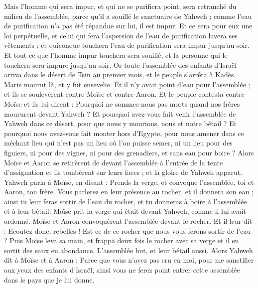 \begin{multicols}{2}
Mais l'homme qui sera impur, et qui ne se purifiera point, sera retranché du milieu de l'assemblée, parce qu'il a souillé le sanctuaire de Yahweh ; comme l'eau de purification n'a pas été répandue sur lui, il est impur.
Et ce sera pour eux une loi perpétuelle, et celui qui fera l'aspersion de l'eau de purification lavera ses vêtements ; et quiconque touchera l'eau de purification sera impur jusqu'au soir.
Et tout ce que l'homme impur touchera sera souillé, et la personne qui le touchera sera impure jusqu'au soir.
\VerseOne{}Or toute l'assemblée des enfants d'Israël arriva dans le désert de Tsin au premier mois, et le peuple s'arrêta à Kadès. Marie mourut là, et y fut ensevelie.
Et il n'y avait point d'eau pour l'assemblée ; et ils se soulevèrent contre Moïse et contre Aaron.
Et le peuple contesta contre Moïse et ils lui dirent : Pourquoi ne sommes-nous pas morts quand nos frères moururent devant Yahweh ?
Et pourquoi avez-vous fait venir l'assemblée de Yahweh dans ce désert, pour que nous y mourions, nous et notre bétail ?
Et pourquoi nous avez-vous fait monter hors d'Egypte, pour nous amener dans ce méchant lieu qui n'est pas un lieu où l'on puisse semer, ni un lieu pour des figuiers, ni pour des vignes, ni pour des grenadiers, et sans eau pour boire ?
Alors Moïse et Aaron se retirèrent de devant l'assemblée à l'entrée de la tente d'assignation et ils tombèrent sur leurs faces ; et la gloire de Yahweh apparut.
Yahweh parla à Moïse, en disant :
Prends la verge, et convoque l'assemblée, toi et Aaron, ton frère. Vous parlerez en leur présence au rocher, et il donnera son eau ; ainsi tu leur feras sortir de l'eau du rocher, et tu donneras à boire à l'assemblée et à leur bétail.
Moïse prit la verge qui était devant Yahweh, comme il lui avait ordonné.
Moïse et Aaron convoquèrent l'assemblée devant le rocher. Et il leur dit : Ecoutez donc, rebelles ! Est-ce de ce rocher que nous vous ferons sortir de l'eau ?
Puis Moïse leva sa main, et frappa deux fois le rocher avec sa verge et il en sortit des eaux en abondance. L'assemblée but, et leur bétail aussi.
Alors Yahweh dit à Moïse et à Aaron : Parce que vous n'avez pas cru en moi, pour me sanctifier aux yeux des enfants d'Israël, ainsi vous ne ferez point entrer cette assemblée dans le pays que je lui donne.

\end{multicols}
